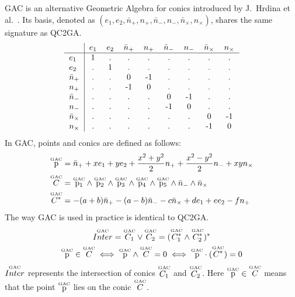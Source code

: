 \documentclass{birkjour}
\begin{document}
GAC is an alternative Geometric Algebra for conics introduced by J.~Hrdina et al.~\cite{hrdina_geometric_2018}. Its basis, denoted as \(\left(e_1, e_2, \bar{n}_+, n_+, \bar{n}_-, n_-, \bar{n}_\times, n_\times\right)\), shares the same signature as QC2GA.
\begin{equation}
    \begin{tabular}{l|cccccccc}
    & \(e_1\)
    & \(e_2\)
    & \(\bar n_+\)
    & \(     n_+\)
    & \(\bar n_-\)
    & \(     n_-\)
    & \(\bar n_\times\)
    & \(     n_\times\) \\
    \hline
    \(e_1           \)  & 1 & . & . & . & . & . & . & . \\
    \(e_2           \)  & . & 1 & . & . & . & . & . & . \\
    \(\bar n_+      \)  & . & . & 0 &-1 & . & . & . & . \\
    \(     n_+      \)  & . & . &-1 & 0 & . & . & . & . \\
    \(\bar n_-      \)  & . & . & . & . & 0 &-1 & . & . \\
    \(     n_-      \)  & . & . & . & . &-1 & 0 & . & . \\
    \(\bar n_\times \)  & . & . & . & . & . & . & 0 &-1 \\
    \(     n_\times \)  & . & . & . & . & . & . &-1 & 0
    \end{tabular}
\end{equation}
In GAC, points and conics are defined as follows:
\begin{align}\displaystyle
\overset{\mbox{\tiny GAC}}{\mathrm{p}} &= \bar n_{+} + x e_1 + y e_2 + \frac{x^2 + y^2}{2} n_{+} + \frac{x^2 - y^2}{2} n_{-} + xy  n_{\times}  \\
\overset{\mbox{\tiny GAC}}{C} &= \overset{\mbox{\tiny GAC}}{\mathrm{p}_1} \wedge \overset{\mbox{\tiny GAC}}{\mathrm{p}_2} \wedge \overset{\mbox{\tiny GAC}}{\mathrm{p}_3} \wedge \overset{\mbox{\tiny GAC}}{\mathrm{p}_4} \wedge \overset{\mbox{\tiny GAC}}{\mathrm{p}_5}\wedge \bar n_- \wedge \bar n_\times\\
\overset{\mbox{\tiny GAC}}{C^*}&= -  (a+b) \bar n_{+} -  (a-b) \bar n_{-} - c \bar n_{\times} + d e_1 + e e_2 - f n_{+} 
\end{align}
The way GAC is used in practice is identical to QC2GA.
\begin{align}\displaystyle %
\gacobject{Inter} = \gacobject{C_1} \vee \gacobject{C_2} = (\gacobject{C^*_1} \wedge \gacobject{C^*_2})^* \span \\ 
\gacobject{\mathrm{p}} \in \gacobject{C} &\iff \gacobject{\mathrm{p}}\wedge \gacobject{C} = 0 \iff \gacobject{\mathrm{p}} \cdot (\gacobject{C^*}) = 0
\end{align}
\(\overset{\mbox{\tiny GAC}}{Inter}\) represents the intersection of conics \(\overset{\mbox{\tiny GAC}}{C_1}\) and \(\overset{\mbox{\tiny GAC}}{C_2}\). Here \(\overset{\mbox{\tiny GAC}}{\mathrm{p}} \in \overset{\mbox{\tiny GAC}}{C}\) means that the point \(\overset{\mbox{\tiny GAC}}{\mathrm{p}}\) lies on the conic \(\overset{\mbox{\tiny GAC}}{C}\).
\end{document}
